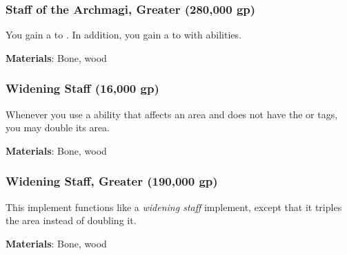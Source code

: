 \lowercase{\hypertarget{item:Staff of the Archmagi, Greater}{}}\label{item:Staff of the Archmagi, Greater}
\hypertarget{item:Staff of the Archmagi, Greater}{\subsubsection{Staff of the Archmagi, Greater\hfill{} (280,000 gp)}}

You gain a   to .
In addition, you gain a   to  with  abilities.



\vspace{0.25em}
\textbf{Materials}: Bone, wood


\lowercase{\hypertarget{item:Widening Staff}{}}\label{item:Widening Staff}
\hypertarget{item:Widening Staff}{\subsubsection{Widening Staff\hfill{} (16,000 gp)}}

Whenever you use a  ability that affects an area and does not have the  or  tags, you may double its area.



\vspace{0.25em}
\textbf{Materials}: Bone, wood


\lowercase{\hypertarget{item:Widening Staff, Greater}{}}\label{item:Widening Staff, Greater}
\hypertarget{item:Widening Staff, Greater}{\subsubsection{Widening Staff, Greater\hfill{} (190,000 gp)}}

This implement functions like a \textit{widening staff} implement, except that it triples the area instead of doubling it.



\vspace{0.25em}
\textbf{Materials}: Bone, wood
